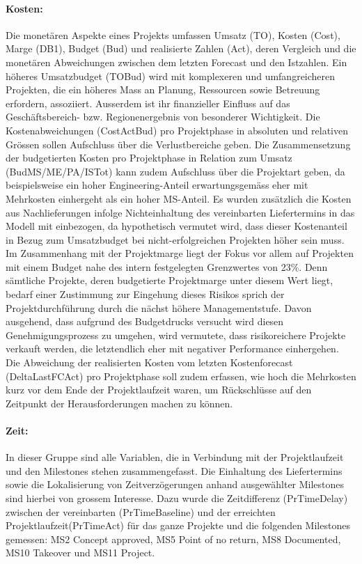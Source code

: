 \paragraph{Kosten:} Die monetären Aspekte eines Projekts umfassen Umsatz (TO), Kosten (Cost), Marge (DB1), Budget (Bud) und realisierte Zahlen (Act), deren Vergleich und die monetären Abweichungen zwischen dem letzten Forecast und den Istzahlen. Ein höheres Umsatzbudget (TOBud) wird mit komplexeren und umfangreicheren Projekten, die ein höheres Mass an Planung, Ressourcen sowie Betreuung erfordern, assoziiert. Ausserdem ist ihr finanzieller Einfluss auf das Geschäftsbereich- bzw. Regionenergebnis von besonderer Wichtigkeit. Die Kostenabweichungen (CostActBud) pro Projektphase in absoluten und relativen Grössen sollen Aufschluss über die Verlustbereiche geben. Die Zusammensetzung der budgetierten Kosten pro Projektphase in Relation zum Umsatz (BudMS/ME/PA/ISTot) kann zudem Aufschluss über die Projektart geben, da beispielsweise ein hoher Engineering-Anteil erwartungsgemäss eher mit Mehrkosten einhergeht als ein hoher MS-Anteil. Es wurden zusätzlich die Kosten aus Nachlieferungen infolge Nichteinhaltung des vereinbarten Liefertermins in das Modell mit einbezogen, da hypothetisch vermutet wird, dass dieser Kostenanteil in Bezug zum Umsatzbudget bei nicht-erfolgreichen Projekten höher sein muss. Im Zusammenhang mit der Projektmarge liegt der Fokus vor allem auf Projekten mit einem Budget nahe des intern festgelegten Grenzwertes von 23\%. Denn sämtliche Projekte, deren budgetierte Projektmarge unter diesem Wert liegt, bedarf einer Zustimmung zur Eingehung dieses Risikos sprich der Projektdurchführung durch die nächst höhere Managementstufe. Davon ausgehend, dass aufgrund des Budgetdrucks versucht wird diesen Genehmigungsprozess zu umgehen, wird vermutete, dass risikoreichere Projekte verkauft werden, die letztendlich eher mit negativer Performance einhergehen. Die Abweichung der realisierten Kosten vom letzten Kostenforecast (DeltaLastFCAct) pro Projektphase soll zudem erfassen, wie hoch die Mehrkosten kurz vor dem Ende der Projektlaufzeit waren, um Rückschlüsse auf den Zeitpunkt der Herausforderungen machen zu können. %
\paragraph{Zeit: } In dieser Gruppe sind alle Variablen, die in Verbindung mit der Projektlaufzeit und den Milestones stehen zusammengefasst. Die Einhaltung des Liefertermins sowie die Lokalisierung von Zeitverzögerungen anhand ausgewählter Milestones sind hierbei von grossem Interesse. Dazu wurde die Zeitdifferenz (PrTimeDelay) zwischen der vereinbarten (PrTimeBaseline) und der erreichten Projektlaufzeit(PrTimeAct) für das ganze Projekte und die folgenden Milestones gemessen: MS2 Concept approved, MS5 Point of no return, MS8 Documented, MS10 Takeover und MS11 Project.
